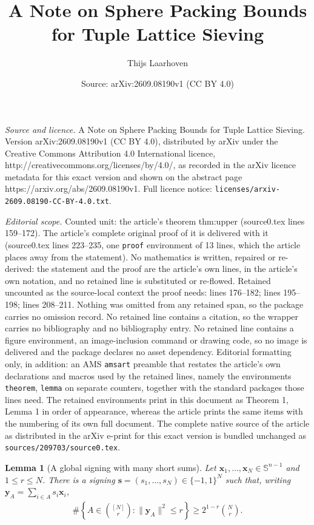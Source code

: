 \documentclass[10pt,a4paper]{amsart}
\title{A Note on Sphere Packing Bounds for Tuple Lattice Sieving}
\author{Thijs Laarhoven}
\date{Source: arXiv:2609.08190v1 (CC BY 4.0)}
\newtheorem{lemma}{Lemma}
\newcommand{\norm}[1]{\lVert#1\rVert}
\newcommand{\sph}{\mathbb S}
\newcommand{\vs}{\mathbf{s}}
\newcommand{\vx}{\mathbf{x}}
\newcommand{\vy}{\mathbf{y}}
\begin{document}
\maketitle

\noindent\emph{Source and licence.} A Note on Sphere Packing Bounds for Tuple Lattice Sieving. Version arXiv:2609.08190v1 (CC BY 4.0), distributed by arXiv under the Creative Commons Attribution 4.0 International licence, http://creativecommons.org/licenses/by/4.0/, as recorded in the arXiv licence metadata for this exact version and shown on the abstract page https://arxiv.org/abs/2609.08190v1. Full licence notice: \texttt{licenses/arxiv-2609.08190-CC-BY-4.0.txt}.\par\smallskip

\noindent\textit{Editorial scope.} Counted unit: the article's theorem thm:upper (source0.tex lines 159--172). The article's complete original proof of it is delivered with it (source0.tex lines 223--235, one \texttt{proof} environment of 13 lines, which the article places away from the statement). No mathematics is written, repaired or re-derived: the statement and the proof are the article's own lines, in the article's own notation, and no retained line is substituted or re-flowed.  Retained uncounted as the source-local context the proof needs: lines 176--182; lines 195--198; lines 208--211.  Nothing was omitted from any retained span, so the package carries no omission record.  No retained line contains a citation, so the wrapper carries no bibliography and no bibliography entry.  No retained line contains a figure environment, an image-inclusion command or drawing code, so no image is delivered and the package declares no asset dependency.  Editorial formatting only, in addition: an AMS \texttt{amsart} preamble that restates the article's own declarations and macros used by the retained lines, namely the environments \texttt{theorem}, \texttt{lemma} on separate counters, together with the standard packages those lines need.  The retained environments print in this document as Theorem 1, Lemma 1 in order of appearance, whereas the article prints the same items with the numbering of its own full document.  The complete native source of the article as distributed in the arXiv e-print for this exact version is bundled unchanged as \texttt{sources/209703/source0.tex}.
\begin{lemma}[A global signing with many short sums]\label{lem:signing}
Let $\vx_1,\ldots,\vx_N\in\sph^{n-1}$ and $1\le r\le N$. There is a signing $\vs=(s_1,\ldots,s_N)\in\{-1,1\}^N$ such that, writing $\vy_A=\sum_{i\in A}s_i\vx_i$,
\begin{align}\label{eq:short-sums}
 \#\left\{A\in\binom{[N]}r:\norm{\vy_A}^2\le r\right\}
 \ge2^{1-r}\binom Nr.
\end{align}
\end{lemma}
\end{document}
